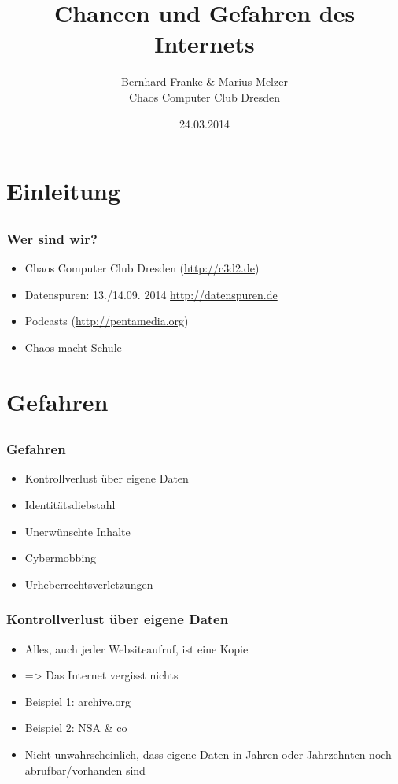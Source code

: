 \documentclass[12pt]{beamer}
\title{Chancen und Gefahren des Internets}
\author{\small Bernhard Franke \& Marius Melzer\\\large Chaos Computer Club Dresden}
\date{24.03.2014}
\begin{document}
\maketitle

\section{Einleitung}
\subsection{}

\begin{frame}
  \frametitle{Wer sind wir?}
  \begin{itemize}
    \item<1-> Chaos Computer Club Dresden (\url{http://c3d2.de})
        \note{}
    \item<2-> Datenspuren: 13./14.09. 2014 \url{http://datenspuren.de}
    \item<3-> Podcasts (\url{http://pentamedia.org})
    \item<4-> Chaos macht Schule
  \end{itemize}
\end{frame}

\section{Gefahren}
\subsection{}

\begin{frame}
  \frametitle{Gefahren}
  \begin{itemize}
    \item<2-> Kontrollverlust über eigene Daten
    \item<3-> Identitätsdiebstahl
    \item<4-> Unerwünschte Inhalte
    \item<5-> Cybermobbing
    \item<6-> Urheberrechtsverletzungen
  \end{itemize}
\end{frame}

\begin{frame}
  \frametitle{Kontrollverlust über eigene Daten}
  \begin{itemize}
    \item<2-> Alles, auch jeder Websiteaufruf, ist eine Kopie
    \item<3-> => Das Internet vergisst nichts 
    \item<4-> Beispiel 1: archive.org
    \item<5-> Beispiel 2: NSA \& co
    \item<6-> Nicht unwahrscheinlich, dass eigene Daten in Jahren oder Jahrzehnten noch abrufbar/vorhanden sind
  \end{itemize}
\end{frame}
\end{document}
